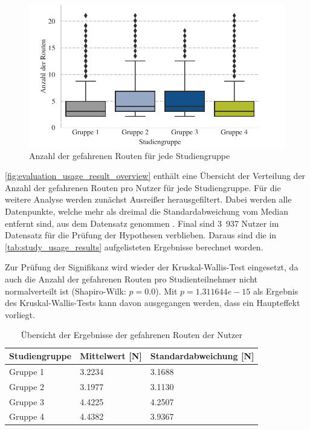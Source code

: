 \begin{figure}[b!]
    \centering
    \includegraphics[width=\textwidth]{contents/06_model_evaluation/02_evaluation/res/usage_result_overview.pdf}
    \caption{Anzahl der gefahrenen Routen für jede Studiengruppe}
    \label{fig:evaluation_usage_result_overview}
\end{figure}

\autoref{fig:evaluation_usage_result_overview} enthält eine Übersicht der Verteilung der Anzahl der gefahrenen Routen pro Nutzer für jede Studiengruppe. Für die weitere Analyse werden zunächst Ausreißer herausgefiltert. Dabei werden alle Datenpunkte, welche mehr als dreimal die Standardabweichung vom Median entfernt sind, aus dem Datensatz genommen \cite{leyes2013detecting}. Final sind 3~937 Nutzer im Datensatz für die Prüfung der Hypothesen verblieben. Daraus sind die in \autoref{tab:study_usage_results} aufgelisteten Ergebnisse berechnet worden.

Zur Prüfung der Signifikanz wird wieder der Kruskal-Wallis-Test eingesetzt, da auch die Anzahl der gefahrenen Routen pro Studienteilnehmer nicht normalverteilt ist (Shapiro-Wilk: $ p = 0.0 $). Mit $ p = 1.311644e-15 $ als Ergebnis des Kruskal-Wallis-Tests kann davon ausgegangen werden, dass ein Haupteffekt vorliegt.

\begin{table}[htb!]
    \centering
    \begin{tabular}{p{}p{}p{}}
        \hline
        Studiengruppe  & Mittelwert [N] & Standardabweichung [N] \\
        \toprule
        Gruppe 1                & 3.2234 & 3.1688 \\
        Gruppe 2                & 3.1977 & 3.1130 \\
        Gruppe 3                & 4.4225 & 4.2507 \\
        Gruppe 4                & 4.4382 & 3.9367 \\
        \bottomrule
    \end{tabular}
    \caption{Übersicht der Ergebnisse der gefahrenen Routen der Nutzer}
    \label{tab:study_usage_results}
\end{table}

